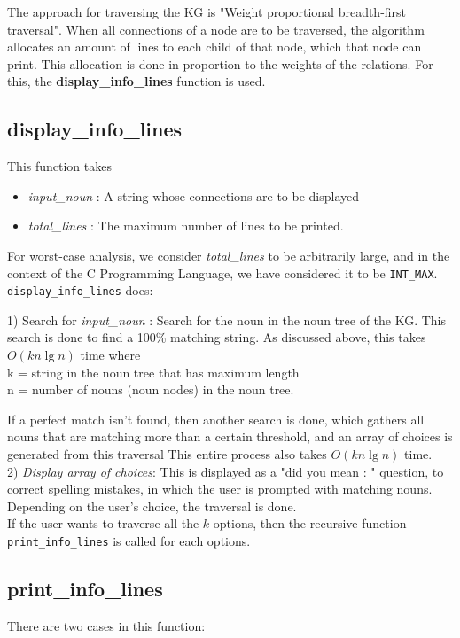 \documentclass[conference]{IEEEtran}
\begin{document}
The approach for traversing the KG is "Weight proportional breadth-first traversal". When all connections of a node are to be traversed, the algorithm allocates an amount of lines to each child of that node, which that node can print. This allocation is done in proportion to the weights of the relations. For this, the \textbf{display\_info\_lines} function is used.



\subsection{\textbf{display\_info\_lines}}

This function takes
\begin{itemize}
\item \textit{input\_noun} : A string whose connections are to be displayed
\item \textit{total\_lines} : The maximum number of lines to be printed. 
\end{itemize}
For worst-case analysis, we consider \textit{total\_lines} to be arbitrarily large, and in the context of the C Programming Language, we have considered it to be \texttt{INT\_MAX}.
\\\texttt{display\_info\_lines} does:

1) Search for \textit{input\_noun} : Search for the noun in the noun tree of the KG. This search is done to find a 100\% matching string. As discussed above, this takes  $O(kn \lg n)$  time where 
\\k = string in the noun tree that has maximum length
\\n = number of nouns (noun nodes) in the noun tree.

If a perfect match isn't found, then another search is done, which gathers all nouns that are matching more than a certain threshold, and an array of choices is generated from this traversal
This entire process also takes $O(kn \lg n)$ time.\\

2) \textit{Display array of choices}: This is displayed as a "did you mean : " question, to correct spelling mistakes, in which the user is prompted with matching nouns. Depending on the user’s choice, the traversal is done.\\

If the user wants to traverse all the $k$ options, then the recursive function \texttt{print\_info\_lines} is called for each options.

\subsection{\textbf{print\_info\_lines}}
There are two cases in this function:
\end{document}

